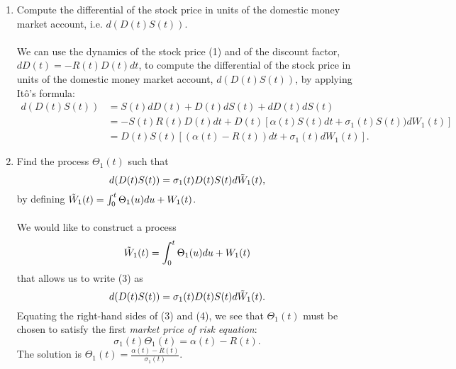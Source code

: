 \documentclass[11pt,a4,table]{article}
\begin{document}
\begin{enumerate}
    \begin{enumerate}
        \item Compute the differential of the stock price in units of the domestic money market account, i.e. $d(D(t)S(t))$.\\\\
        We can use the dynamics of the stock price (1) and of the discount factor, $dD(t) = - R(t)D(t) dt$, to compute the differential of the stock price in units of the domestic money market account, $d(D(t)S(t))$, by applying Itô's formula:
        \begin{align}
            d(D(t)S(t)) &= S(t)dD(t) + D(t)dS(t) + dD(t)dS(t) \nonumber\\
            &= -S(t)R(t)D(t) dt + D(t)[\alpha(t)S(t) dt + \sigma_1(t)S(t)) dW_1(t)] \nonumber\\
            &= D(t)S(t)[(\alpha(t) - R(t)) dt + \sigma_1(t) dW_1(t)].
        \end{align}
        
        \item Find the process $\Theta_1(t)$ such that
        \begin{equation*}
            d(D(t)S(t)) = \sigma_1(t)D(t)S(t) d\Tilde{W}_1(t),
        \end{equation*}
        by defining $\Tilde{W}_1(t)=\int_0^t\Theta_1(u) du + W_1(t)$.\\\\
        We would like to construct a process
        \begin{equation*}
            \Tilde{W}_1(t) = \int_0^t \Theta_1(u) du + W_1(t)
        \end{equation*}
        that allows us to write (3) as
        \begin{equation}
            d(D(t)S(t)) = \sigma_1(t)D(t)S(t) d\Tilde{W}_1(t).
        \end{equation}
        Equating the right-hand sides of (3) and (4), we see that $\Theta_1(t)$ must be chosen to satisfy the first \textit{market price of risk equation}:
        \begin{equation}
            \sigma_1(t)\Theta_1(t) = \alpha(t) - R(t).
        \end{equation}
        The solution is $\Theta_1(t) = \frac{\alpha(t) - R(t)}{\sigma_1(t)}$.
        

\end{enumerate}
\end{enumerate}
\end{document}
